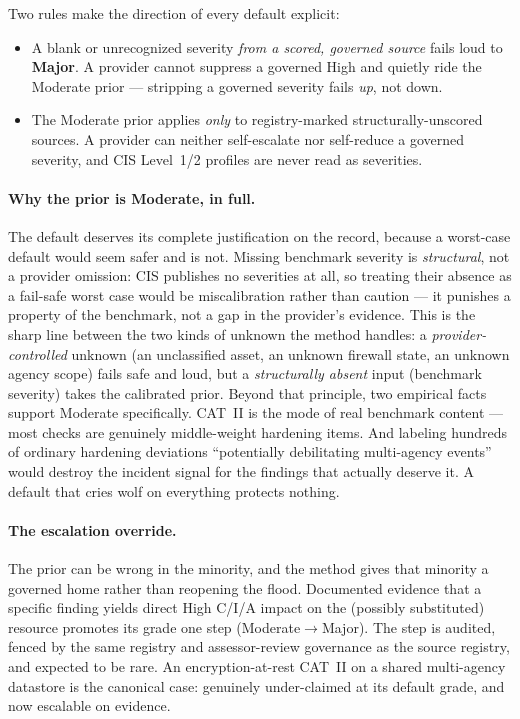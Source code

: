 \documentclass[11pt]{article}
\begin{document}
Two rules make the direction of every default explicit:

\begin{itemize}[leftmargin=1.4em,nosep,topsep=3pt]
\item A blank or unrecognized severity \emph{from a scored, governed source} fails
  loud to \textbf{Major}. A provider cannot suppress a governed High and quietly ride
  the Moderate prior --- stripping a governed severity fails \emph{up}, not down.
\item The Moderate prior applies \emph{only} to registry-marked structurally-unscored
  sources. A provider can neither self-escalate nor self-reduce a governed severity,
  and CIS Level~1/2 profiles are never read as severities.
\end{itemize}

\paragraph{Why the prior is Moderate, in full.} The default deserves its complete
justification on the record, because a worst-case default would seem safer and is
not. Missing benchmark severity is \emph{structural}, not a provider omission: CIS
publishes no severities at all, so treating their absence as a fail-safe worst case
would be miscalibration rather than caution --- it punishes a property of the
benchmark, not a gap in the provider's evidence. This is the sharp line between the
two kinds of unknown the method handles: a \emph{provider-controlled} unknown (an
unclassified asset, an unknown firewall state, an unknown agency scope) fails safe
and loud, but a \emph{structurally absent} input (benchmark severity) takes the
calibrated prior. Beyond that principle, two empirical facts support Moderate
specifically. CAT~II is the mode of real benchmark content --- most checks are
genuinely middle-weight hardening items. And labeling hundreds of ordinary hardening
deviations ``potentially debilitating multi-agency events'' would destroy the
incident signal for the findings that actually deserve it. A default that cries wolf
on everything protects nothing.

\paragraph{The escalation override.} The prior can be wrong in the minority, and the
method gives that minority a governed home rather than reopening the flood.
Documented evidence that a specific finding yields direct High C/I/A impact on the
(possibly substituted) resource promotes its grade one step
(Moderate${}\rightarrow{}$Major). The step is audited, fenced by the same registry
and assessor-review governance as the source registry, and expected to be rare. An
encryption-at-rest CAT~II on a shared multi-agency datastore is the canonical case:
genuinely under-claimed at its default grade, and now escalable on evidence.
\end{document}
